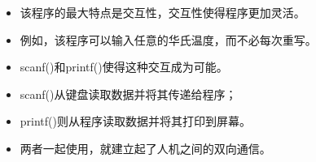 \begin{frame}[fragile]\ft{\secname}
\begin{itemize}
\item
该程序的最大特点是\textcolor{acolor1}{交互性}，交互性使得程序更加灵活。\\[0.1in]
\item[] 例如，该程序可以输入任意的华氏温度，而不必每次重写。\\[0.2in]
\item scanf()和printf()使得这种交互成为可能。\\[0.1in]
\item[] scanf()从键盘读取数据并将其传递给程序；\\[0.1in]
\item[] printf()则从程序读取数据并将其打印到屏幕。\\[0.1in]
\item[] 两者一起使用，就建立起了人机之间的双向通信。
\end{itemize}

\end{frame}




